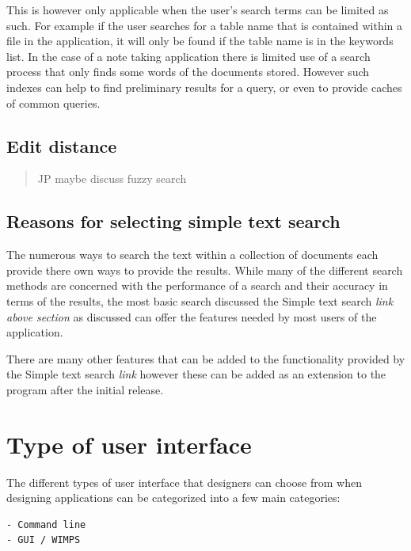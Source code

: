 This is however only applicable when the user's search terms can be
limited as such. For example if the user searches for a table name that
is contained within a file in the application, it will only be found if
the table name is in the keywords list. In the case of a note taking
application there is limited use of a search process that only finds
some words of the documents stored. However such indexes can help to
find preliminary results for a query, or even to provide caches of
common queries.

\subsection{Edit distance}\label{edit-distance}

\begin{quote}
JP maybe discuss fuzzy search
\end{quote}

\subsection{Reasons for selecting simple text
search}\label{reasons-for-selecting-simple-text-search}

The numerous ways to search the text within a collection of documents
each provide there own ways to provide the results. While many of the
different search methods are concerned with the performance of a search
and their accuracy in terms of the results, the most basic search
discussed the Simple text search \emph{link above section} as discussed
can offer the features needed by most users of the application.

There are many other features that can be added to the functionality
provided by the Simple text search \emph{link} however these can be
added as an extension to the program after the initial release.

\section{Type of user interface}\label{type-of-user-interface}

The different types of user interface that designers can choose from
when designing applications can be categorized into a few main
categories:

\begin{verbatim}
- Command line
- GUI / WIMPS
\end{verbatim}

